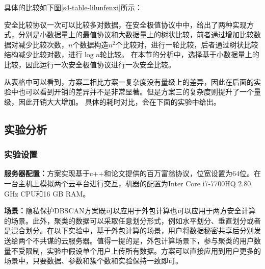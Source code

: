 具体的比较如下图\ref{s4-table-lilunfenxi}所示：

\begin{table}[htbp]
	\centering
	\renewcommand{\arraystretch}{1.3}
	\caption{方案复杂度理论分析}
	\label{s4-table-lilunfenxi}
\end{table}

安全比较协议一次可以比较多对数据，在安全极值协议中中，给出了两种实现方式，分别是小数据量上的最值协议和大数据量上的树状比较，前者通过增加比较数据对减少比较次数，$ n $个数据构造$ n^2 $个比较对，进行一轮比较，后者通过树状比较结构减少比较对数，进行$ \log n $轮比较。
在本节的分析中，选择基于小数据量上的比较，因此运行一次安全极值协议进行一次安全比较。

从表格中可以看到，方案二相比方案一复杂度没有量级上的差异，因此在后面的实验中也可以看到开销的差异并不是非常显著。但是方案三的复杂度则提升了一个量级，因此开销大大增加。
具体的耗时对比，会在下面的实验中给出。
\subsection{实验分析}
\subsubsection{实验设置}
\textbf{服务器配置：}方案实现基于c++和论文\cite{rathee2020cryptflow2}提供的百万富翁协议，位宽设置为64位。在一台主机上模拟两个云平台进行交互，机器的配置为Inter Core i7-7700HQ 2.80 GHz CPU和16 GB RAM。

\textbf{场景：}隐私保护DBSCAN方案既可以应用于外包计算也可以应用于两方安全计算的场景。此外，聚类的数据可以采取任意划分形式，例如水平划分、垂直划分或者是混合划分。在以下实验中，基于外包计算的场景，用户将数据秘密共享后分别发送给两个不共谋的云服务器。值得一提的是，外包计算场景下，参与聚类的用户数量不受限制，实验中假设单个用户上传所有数据。方案可以直接应用到用户更多的场景中，只要数据、参数和簇个数和实验保持一致即可。

